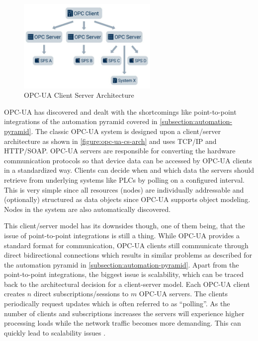     \begin{figure}[htbp]
        \centering
        \includegraphics[width=0.6\textwidth]{img/opc-ua-cs-img.jpeg}
        \caption{OPC-UA Client Server Architecture \cite{rinke_was_2022}}
        \label{figure:opc-ua-cs-arch}
    \end{figure}

    \noindent OPC-UA has discovered and dealt with the shortcomings like point-to-point integrations of the automation pyramid covered in \autoref{subsection:automation-pyramid}. The classic OPC-UA system is designed upon a client/server architecture as shown in \autoref{figure:opc-ua-cs-arch} and uses TCP/IP and HTTP/SOAP. OPC-UA servers are responsible for converting the hardware communication protocols so that device data can be accessed by OPC-UA clients in a standardized way. Clients can decide when and which data the servers should retrieve from underlying systems like PLCs by polling on a configured interval. This is very simple since all resources (nodes) are individually addressable and (optionally) structured as data objects since OPC-UA supports object modeling. Nodes in the system are also automatically discovered. 
    
    This client/server model has its downsides though, one of them being, that the issue of point-to-point integrations is still a thing. While OPC-UA provides a standard format for communication, OPC-UA clients still communicate through direct bidirectional connections which results in similar problems as described for the automation pyramid in \autoref{subsection:automation-pyramid}. Apart from the point-to-point integrations, the biggest issue is scalability, which can be traced back to the architectural decision for a client-server model. Each OPC-UA client creates $n$ direct subscriptions/sessions to $m$ OPC-UA servers. The clients periodically request updates which is often referred to as ``polling''. As the number of clients and subscriptions increases the servers will experience higher processing loads while the network traffic becomes more demanding. This can quickly lead to scalability issues \cite{hivemq_opcua_vs_mqtt_sparkplug, manditereza_key_nodate}. 

